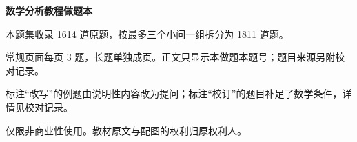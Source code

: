\documentclass[UTF8,a4paper,12pt,fontset=fandol]{ctexart}
\begin{document}
\thispagestyle{empty}
\begin{center}{\LARGE\bfseries 数学分析教程做题本}\par\vspace{6mm}{\large 完整题集}\end{center}
本题集收录 1614 道原题，按最多三个小问一组拆分为 1811 道题。

常规页面每页 3 题，长题单独成页。正文只显示本做题本题号；题目来源另附校对记录。

标注“改写”的例题由说明性内容改为提问；标注“校订”的题目补足了数学条件，详情见校对记录。

仅限非商业性使用。教材原文与配图的权利归原权利人。
\tableofcontents\clearpage
\clearpage
\clearpage
\clearpage
\clearpage
\clearpage
\clearpage
\clearpage
\clearpage
\clearpage
\clearpage
\clearpage
\clearpage
\clearpage
\clearpage
\clearpage
\clearpage
\clearpage
\clearpage
\clearpage
\end{document}
